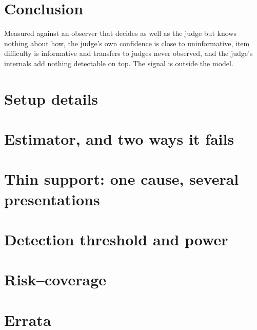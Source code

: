 \documentclass{article}
\begin{document}
\section{Conclusion}

Measured against an observer that decides as well as the judge but knows nothing about how, the
judge's own confidence is close to uninformative, item difficulty is informative and transfers to
judges never observed, and the judge's internals add nothing detectable on top. The signal is
outside the model.



\label{sec:refstart}



\appendix
\section{Setup details}\label{app:setup}
\section{Estimator, and two ways it fails}\label{app:estimator}
\section{Thin support: one cause, several presentations}\label{app:thin}
\section{Detection threshold and power}\label{app:power}
\section{Risk--coverage}\label{app:coverage}
\section{Errata}\label{app:errata}
\end{document}
